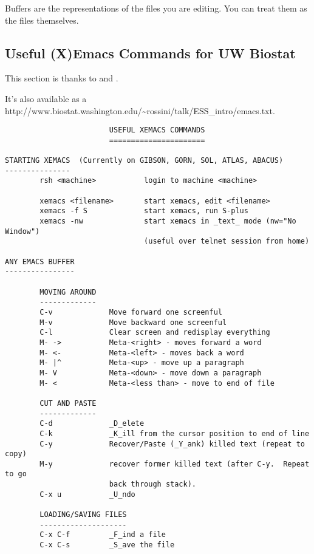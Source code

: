 \documentclass{article}
\begin{document}
Buffers are the representations of the files you are editing.  You can
treat them as the files themselves.


\subsection{Useful (X)Emacs Commands for UW Biostat}
\label{sec:emacs:uwbiostat}

This section is thanks to  and
.

It's also available as a 
{http://www.biostat.washington.edu/\~{}rossini/talk/ESS\_intro/emacs.txt}.

\begin{verbatim}
                        USEFUL XEMACS COMMANDS
                        ======================

STARTING XEMACS  (Currently on GIBSON, GORN, SOL, ATLAS, ABACUS)
---------------
        rsh <machine>           login to machine <machine>

        xemacs <filename>       start xemacs, edit <filename>
        xemacs -f S             start xemacs, run S-plus
        xemacs -nw              start xemacs in _text_ mode (nw="No Window")
                                (useful over telnet session from home)

ANY EMACS BUFFER
----------------

        MOVING AROUND
        -------------
        C-v             Move forward one screenful
        M-v             Move backward one screenful
        C-l             Clear screen and redisplay everything
        M- ->           Meta-<right> - moves forward a word 
        M- <-           Meta-<left> - moves back a word
        M- |^           Meta-<up> - move up a paragraph
        M- V            Meta-<down> - move down a paragraph
        M- <            Meta-<less than> - move to end of file
        
        CUT AND PASTE
        -------------
        C-d             _D_elete
        C-k             _K_ill from the cursor position to end of line
        C-y             Recover/Paste (_Y_ank) killed text (repeat to copy) 
        M-y             recover former killed text (after C-y.  Repeat to go 
                        back through stack).
        C-x u           _U_ndo

        LOADING/SAVING FILES
        --------------------
        C-x C-f         _F_ind a file
        C-x C-s         _S_ave the file


\end{verbatim}
\end{document}
